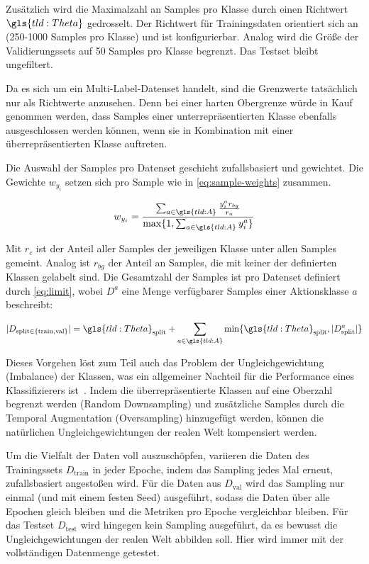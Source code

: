 Zusätzlich wird die Maximalzahl an Samples pro Klasse durch einen Richtwert $\gls{tld:Theta}$ gedrosselt.
Der Richtwert für Trainingsdaten orientiert sich an~\cite{Kay17} (250-1000 Samples pro Klasse) und ist konfigurierbar.
Analog wird die Größe der Validierungssets auf 50 Samples pro Klasse begrenzt.
Das Testset bleibt ungefiltert.

Da es sich um ein Multi-Label-Datenset handelt, sind die Grenzwerte tatsächlich nur als Richtwerte anzusehen.
Denn bei einer harten Obergrenze würde in Kauf genommen werden, dass Samples einer unterrepräsentierten Klasse ebenfalls ausgeschlossen werden können, wenn sie in Kombination mit einer überrepräsentierten Klasse auftreten.

Die Auswahl der Samples pro Datenset geschieht zufallsbasiert und gewichtet.
Die Gewichte $w_{y_i}$ setzen sich pro Sample wie in \autoref{eq:sample-weights} zusammen.

\begin{equation}
    \label{eq:sample-weights}
    w_{y_i} = \frac{\sum_{a \in \gls{tld:A}} \frac{y_i^a r_{bg}}{r_a} }{\max \{1, \sum_{a \in \gls{tld:A}} y_i^a\}}
\end{equation}

Mit $r_{c}$ ist der Anteil aller Samples der jeweiligen Klasse unter allen Samples gemeint.
Analog ist $r_{bg}$ der Anteil an Samples, die mit keiner der definierten Klassen gelabelt sind.
Die Gesamtzahl der Samples ist pro Datenset definiert durch \autoref{eq:limit}, wobei $D^a$ eine Menge verfügbarer Samples einer Aktionsklasse $a$ beschreibt:

\begin{equation}
    \label{eq:limit}
    | D_{\text{split} \in \{\text{train}, \text{val}\}} | = \gls{tld:Theta}_\text{split} + \sum\limits_{a \in \gls{tld:A}} \min \{ \gls{tld:Theta}_\text{split}, |D^a_\text{split}| \}
\end{equation}

Dieses Vorgehen löst zum Teil auch das Problem der Ungleichgewichtung (Imbalance) der Klassen, was ein allgemeiner Nachteil für die Performance eines Klassifizierers ist~\cite{Giancola18, Burkov19}.
Indem die überrepräsentierte Klassen auf eine Oberzahl begrenzt werden (Random Downsampling) und zusätzliche Samples durch die Temporal Augmentation (Oversampling) hinzugefügt werden, können die natürlichen Ungleichgewichtungen der realen Welt kompensiert werden.

Um die Vielfalt der Daten voll auszuschöpfen, variieren die Daten des Trainingssets $D_{\text{train}}$ in jeder Epoche, indem das Sampling jedes Mal erneut, zufallsbasiert angestoßen wird.
Für die Daten aus $D_\text{val}$ wird das Sampling nur einmal (und mit einem festen Seed) ausgeführt, sodass die Daten über alle Epochen gleich bleiben und die Metriken pro Epoche vergleichbar bleiben.
Für das Testset $D_\text{test}$ wird hingegen kein Sampling ausgeführt, da es bewusst die Ungleichgewichtungen der realen Welt abbilden soll.
Hier wird immer mit der vollständigen Datenmenge getestet.

